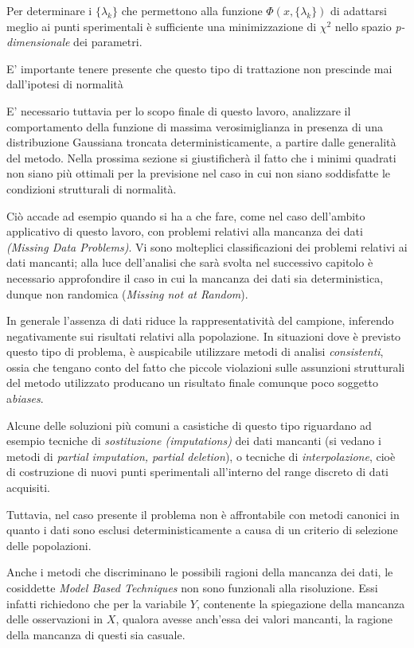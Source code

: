 \documentclass[12pt,openright,twoside,a4paper]{book}
\begin{document}
Per determinare i $\{\lambda_k\}$ che permettono alla funzione $\Phi(x,\{\lambda_k\})$ di adattarsi meglio ai punti sperimentali è sufficiente una minimizzazione di $\chi^2$ nello spazio \textit{p-dimensionale} dei parametri. \cite{fornasini}

E' importante tenere presente che questo tipo di trattazione non prescinde mai dall'ipotesi di normalità

E' necessario tuttavia per lo scopo finale di questo lavoro, analizzare il comportamento della funzione di massima verosimiglianza in presenza di una distribuzione Gaussiana troncata deterministicamente, a partire dalle generalità del metodo.
Nella prossima sezione si giustificherà il fatto che i minimi quadrati non siano più ottimali per la previsione nel caso in cui non siano soddisfatte le condizioni strutturali di normalità.

Ciò accade ad esempio quando si ha a che fare, come nel caso dell'ambito applicativo di questo lavoro, con problemi relativi alla mancanza dei dati \textit{(Missing Data Problems)}.
Vi sono molteplici classificazioni dei problemi relativi ai dati mancanti; alla luce dell'analisi che sarà svolta nel successivo capitolo è necessario approfondire il caso in cui la mancanza dei dati sia deterministica, dunque non randomica (\textit{Missing not at Random}).

In generale l'assenza di dati riduce la rappresentatività del campione, inferendo negativamente sui risultati relativi alla popolazione.
In situazioni dove è previsto questo tipo di problema, è auspicabile utilizzare metodi di analisi \textit{consistenti}, ossia che tengano conto del fatto che piccole violazioni sulle assunzioni strutturali del metodo utilizzato producano un risultato finale comunque poco soggetto a\textit{biases}.

Alcune delle soluzioni più comuni a casistiche di questo tipo riguardano ad esempio tecniche di \textit{sostituzione (imputations)} dei dati mancanti (si vedano i metodi di \textit{partial imputation, partial deletion}), o tecniche di \textit{interpolazione}, cioè di costruzione di nuovi punti sperimentali all'interno del range discreto di dati acquisiti. \cite{Mdata}

Tuttavia, nel caso presente il problema non è affrontabile con metodi canonici in quanto i dati sono esclusi deterministicamente a causa di un criterio di selezione delle popolazioni.

Anche i metodi che discriminano le possibili ragioni della mancanza dei dati, le cosiddette \textit{Model Based Techniques} non sono funzionali alla risoluzione.
Essi infatti richiedono che per la variabile $Y$, contenente la spiegazione della mancanza delle osservazioni in $X$, qualora avesse anch'essa dei valori mancanti, la ragione della mancanza di questi sia casuale. \cite{Mdata}
\end{document}
